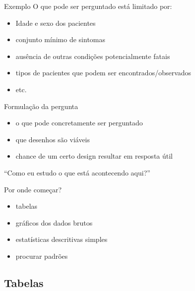 \documentclass{beamer}
\begin{document}
\begin{frame}{Exemplo}
  \scriptsize
  O que \alert{pode} ser perguntado está limitado por:
  \bigskip
  \begin{itemize}
    \footnotesize
  \item Idade e sexo dos pacientes
    \bigskip
  \item conjunto mínimo de sintomas
    \bigskip
  \item ausência de outras condições potencialmente fatais
    \bigskip
  \item tipos de pacientes que podem ser encontrados/observados
  \item etc.
  \end{itemize}
\end{frame}

\begin{frame}{Formulação da pergunta}
  \begin{itemize}
    \footnotesize
  \item o que pode concretamente ser perguntado
    \bigskip
  \item que desenhos são viáveis
    \bigskip
  \item chance de um certo design resultar em resposta útil
  \end{itemize}
  \bigskip
  \pause
  \begin{block}{}
    { ``Como eu estudo o que está acontecendo aqui?''}
  \end{block}
\end{frame}

\begin{frame}{Por onde começar?}
  \begin{itemize}
    \footnotesize
  \item tabelas
    \bigskip
  \item gráficos dos dados brutos
    \bigskip
  \item estatísticas descritivas simples
    \bigskip
  \item procurar padrões
  \end{itemize}
\end{frame}

\subsection{Tabelas}
\end{document}
